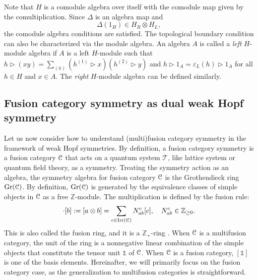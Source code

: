 \documentclass[a4paper,11pt]{article}
\theoremstyle{theorem}
\theoremstyle{remark}
\newcommand\eC           {\EuScript{C}}
\newcommand{\Irr}{\operatorname{Irr}}
\begin{document}
Note that \( H \) is a comodule algebra over itself with the comodule map given by the comultiplication. Since \( \Delta \) is an algebra map and 
\begin{equation}
    \Delta(1_H) \in H_R \otimes H_L,
\end{equation}
the comodule algebra conditions are satisfied.
The topological boundary condition can also be characterized via the module algebra.
An algebra \(A\) is called a \emph{left} \(H\)-module algebra if \(A\) is a left \(H\)-module such that \(h \triangleright (xy) = \sum_{(h)} (h^{(1)} \triangleright x)(h^{(2)} \triangleright y)\) and \(h \triangleright 1_A = \varepsilon_L(h) \triangleright 1_A\) for all \(h \in H\) and \(x \in A\). The \emph{right} \(H\)-module algebra can be defined similarly.


\subsection{Fusion category symmetry as dual weak Hopf symmetry}



Let us now consider how to understand (multi)fusion category symmetry in the framework of weak Hopf symmetries.
By definition, a fusion category symmetry is a fusion category $\eC$ that acts on a quantum system $\mathcal{T}$, like lattice system or quantum field theory, as a symmetry.
Treating the symmetry action as an algebra, the symmetry algebra for fusion category $\eC$ is the Grothendieck ring 
$\operatorname{Gr}(\eC)$. By definition, \( \operatorname{Gr}(\eC) \) is generated by the equivalence classes of simple objects in \( \eC \) as a free \( \mathbb{Z} \)-module. The multiplication is defined by the fusion rule:  
\begin{equation}
    [a] \cdot [b] := [a \otimes b] = \sum_{c \in \Irr(\eC)} N_{ab}^c [c], \quad N_{ab}^c \in \mathbb{Z}_{\geq 0}.
\end{equation}
This is also called the fusion ring, and it is a \( \mathbb{Z}_+ \)-ring \cite{etingof2016tensor}. When \( \eC \) is a multifusion category, the unit of the ring is a nonnegative linear combination of the simple objects that constitute the tensor unit \( \mathbb{1} \) of \( \eC \). When \( \eC \) is a fusion category, \( [\mathbb{1}] \) is one of the basis elements. Hereinafter, we will primarily focus on the fusion category case, as the generalization to multifusion categories is straightforward.
\end{document}
